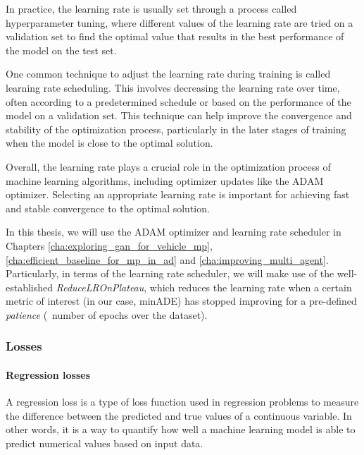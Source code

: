 In practice, the learning rate is usually set through a process called hyperparameter tuning, where different values of the learning rate are tried on a validation set to find the optimal value that results in the best performance of the model on the test set.

One common technique to adjust the learning rate during training is called learning rate scheduling. This involves decreasing the learning rate over time, often according to a predetermined schedule or based on the performance of the model on a validation set. This technique can help improve the convergence and stability of the optimization process, particularly in the later stages of training when the model is close to the optimal solution.

Overall, the learning rate plays a crucial role in the optimization process of machine learning algorithms, including optimizer updates like the \ac{ADAM} optimizer. Selecting an appropriate learning rate is important for achieving fast and stable convergence to the optimal solution.

In this thesis, we will use the \ac{ADAM} optimizer and learning rate scheduler in Chapters \ref{cha:exploring_gan_for_vehicle_mp}, \ref{cha:efficient_baseline_for_mp_in_ad} and \ref{cha:improving_multi_agent}. Particularly, in terms of the learning rate scheduler, we will make use of the well-established \textit{ReduceLROnPlateau}, which reduces the learning rate when a certain metric of interest (in our case, \ac{minADE}) has stopped improving for a pre-defined \textit{patience} (\ie \ number of epochs over the dataset).

\subsubsection{Losses}
\label{subsubsec:3_losses}

\paragraph{Regression losses}
\label{par:3_regressions_losses}


A regression loss is a type of loss function used in regression problems to measure the difference between the predicted and true values of a continuous variable. In other words, it is a way to quantify how well a machine learning model is able to predict numerical values based on input data.

